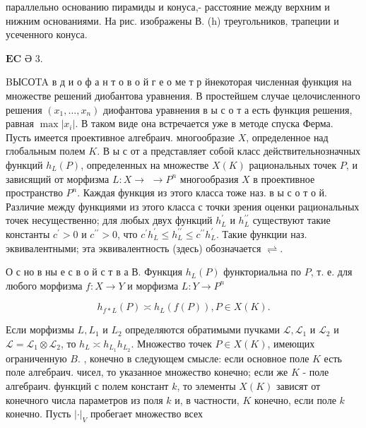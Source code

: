 \documentclass[10pt]{article}
\begin{document}
параллельно основанию пирамиды и конуса,- расстояние между верхним и нижним основаниями. На рис. изображены В. (h) треугольников, трапеции и усеченного конуса.

$\boldsymbol{E C}$ Ə 3.



BЫСОTA в д и о ф а н т о в о й г е о ме т р йнекоторая численная функция на множестве решений диобантова уравнения. В простейшем случае целочисленного решения $\left(x_{1}, \ldots, x_{n}\right)$ диофантова уравнения в ы с о т а есть функция решения, равная $\max \left|x_{i}\right|$. В таком виде она встречается уже в методе спуска Ферма. Пусть имеется проективное алгебраич. многообразие $X$, определенное над глобальным полем $K$. В ы с от а представляет собой класс действительнозначных функций $h_{L}(P)$, определенных на множестве $X(K)$ рациональных точек $P$, и зависящий от морфизма $L: X \rightarrow$ $\rightarrow P^{n}$ многообразия $X$ в проективное пространство $P^{n}$. Каждая функция из этого класса тоже наз. в ы с о т о й. Различие между функциями из этого класса с точки зрения оценки рациональных точек несущественно; для любых двух функций $h_{L}^{\prime}$ и $h_{L}^{\prime \prime}$ существуют такие константы $c^{\prime}>0$ и $c^{\prime \prime}>0$, что $c^{\prime} h_{L}^{\prime} \leqslant h_{L}^{\prime \prime} \leqslant c^{\prime \prime} h_{L}^{\prime}$. Такие функции наз. эквивалентными; эта эквивалентность (здесь) обозначается $\rightleftharpoons$.



О с но в ны е с в о й с т в а В. Функция $h_{L}(P)$ функториальна по $P$, т. е. для любого морфизма $f: X \rightarrow Y$ и морфизма $L: Y \rightarrow P^{n}$



\[

h_{f * L}(P) \asymp h_{L}(f(P)), P \in X(K) .

\]



Если морфизмы $L, L_{1}$ и $L_{2}$ определяются обратимыми пучками $\mathscr{L}, \mathscr{L}_{1}$ и $\mathscr{L}_{2}$ и $\mathscr{L}=\mathscr{L}_{1} \otimes \mathscr{L}_{2}$, то $h_{L} \asymp h_{L_{1}} h_{L_{2}}$. Множество точек $P \in X(K)$, имеющих ограниченную $B$. , конечно в следующем смысле: если основное поле $K$ есть поле алгебраич. чисел, то указанное множество конечно; если же $K$ - поле алгебраич. функций с полем констант $k$, то элементы $X(K)$ зависят от конечного числа параметров из поля $k$ и, в частности, $K$ конечно, если поле $k$ конечно. Пусть $|\cdot|_{V}$ пробегает множество всех
\end{document}
